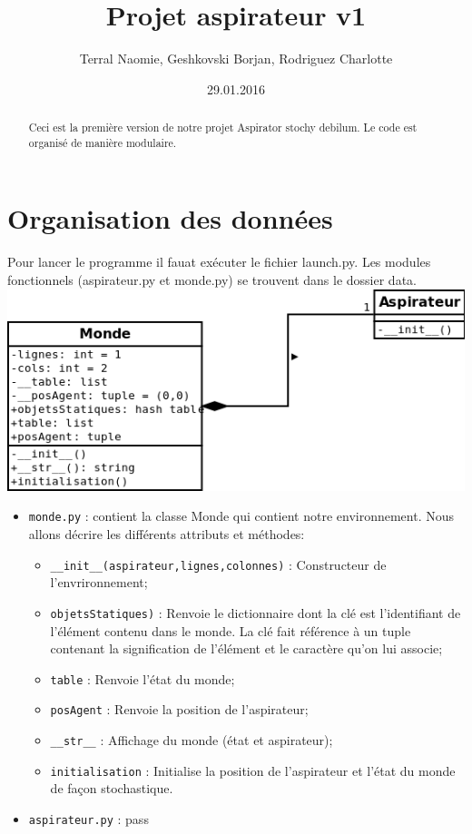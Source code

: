 \documentclass[a4paper,10pt]{article}
\title{Projet aspirateur v1}
\author{Terral Naomie, Geshkovski Borjan, Rodriguez Charlotte}
\date{29.01.2016}
\begin{document}
\maketitle

\begin{abstract}
Ceci est la première version de notre projet Aspirator stochy debilum. Le code est organisé de manière modulaire. 
\end{abstract}

\section*{Organisation des données}
Pour lancer le programme il fauat exécuter le fichier launch.py. Les modules fonctionnels (aspirateur.py et monde.py) se trouvent dans le dossier data.\\ 

\includegraphics[scale=0.5]{architecture}

\begin{itemize}
 \item \texttt{monde.py} : contient la classe Monde qui contient notre environnement. Nous allons décrire les différents attributs et méthodes:
  \begin{itemize}
  \item \texttt{\_\_init\_\_(aspirateur,lignes,colonnes)} : Constructeur de l'envrironnement;
  \item \texttt{objetsStatiques)} : Renvoie le dictionnaire dont la clé est l'identifiant de l'élément contenu dans le monde. La clé fait référence à un tuple contenant la signification de l'élément et le caractère qu'on lui associe;
  \item \texttt{table} : Renvoie l'état du monde;
  \item \texttt{posAgent} : Renvoie la position de l'aspirateur;
  \item \texttt{\_\_str\_\_} : Affichage du monde (état et aspirateur);
  \item \texttt{initialisation} : Initialise la position de l'aspirateur et l'état du monde de façon stochastique.
  \end{itemize}
 \item \texttt{aspirateur.py} : pass
\end{itemize}
\end{document}
